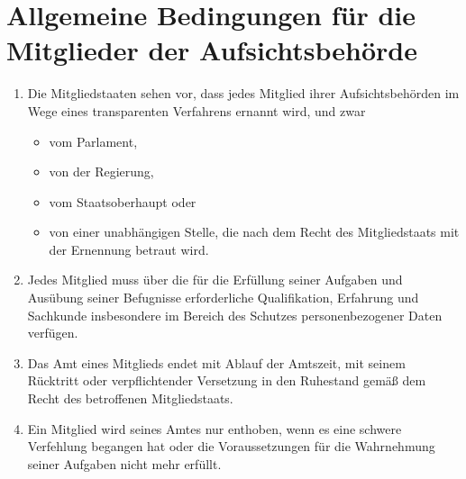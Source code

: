 \chapter{Allgemeine Bedingungen für die Mitglieder der Aufsichtsbehörde}
\label{ch:53}


\begin{enumerate}

  \item Die Mitgliedstaaten sehen vor, dass jedes Mitglied ihrer Aufsichtsbehörden im Wege eines transparenten
   Verfahrens ernannt wird, und zwar
  \label{itm:53-1}

  \begin{itemize}
    \item vom Parlament,
    \item von der Regierung,
    \item vom Staatsoberhaupt oder
    \item von einer unabhängigen Stelle, die nach dem Recht des Mitgliedstaats mit der Ernennung betraut wird.
  \end{itemize}

  \item Jedes Mitglied muss über die für die Erfüllung seiner Aufgaben und Ausübung seiner Befugnisse erforderliche
   Qualifikation, Erfahrung und Sachkunde insbesondere im Bereich des Schutzes personenbezogener Daten verfügen.
  \label{itm:53-2}

  \item Das Amt eines Mitglieds endet mit Ablauf der Amtszeit, mit seinem Rücktritt oder verpflichtender Versetzung in
   den Ruhestand gemäß dem Recht des betroffenen Mitgliedstaats.
  \label{itm:53-3}

  \item Ein Mitglied wird seines Amtes nur enthoben, wenn es eine schwere Verfehlung begangen hat oder die
   Voraussetzungen für die Wahrnehmung seiner Aufgaben nicht mehr erfüllt.
  \label{itm:53-4}

\end{enumerate}


